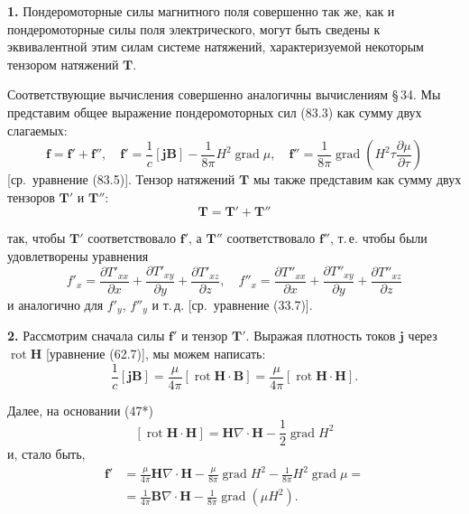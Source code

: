 \documentclass[a4paper,12pt]{article}
\begin{document}

\textbf{1.} Пондеромоторные силы магнитного поля совершенно так же,
как и пондеромоторные силы поля электрического, могут быть сведены
к эквивалентной этим силам системе натяжений, характеризуемой некоторым
тензором натяжений $\mathbf{T}$.

Соответствующие вычисления совершенно аналогичны вычислениям §\,34.
Мы представим общее выражение пондеромоторных сил (83.3) как сумму
двух слагаемых:
\begin{equation}
    \mathbf{f} = \mathbf{f}' + \mathbf{f}'', \quad
    \mathbf{f}' = \frac{1}{c}[\mathbf{j}\mathbf{B}]
               - \frac{1}{8\pi}H^2\operatorname{grad}\mu, \quad
    \mathbf{f}'' = \frac{1}{8\pi}\operatorname{grad}\!\left(
        H^2\tau\frac{\partial\mu}{\partial\tau}
    \right)
    \tag{84.1}
\end{equation}
[ср.\ уравнение (83.5)]. Тензор натяжений $\mathbf{T}$ мы также
представим как сумму двух тензоров $\mathbf{T}'$ и $\mathbf{T}''$:
\begin{equation}
    \mathbf{T} = \mathbf{T}' + \mathbf{T}''
    \tag{84.2}
\end{equation}


так, чтобы $\mathbf{T}'$ соответствовало $\mathbf{f}'$, а $\mathbf{T}''$
соответствовало $\mathbf{f}''$, т.\,е. чтобы были удовлетворены уравнения
\begin{equation}
    f'_x = \frac{\partial T'_{xx}}{\partial x}
          + \frac{\partial T'_{xy}}{\partial y}
          + \frac{\partial T'_{xz}}{\partial z}, \quad
    f''_x = \frac{\partial T''_{xx}}{\partial x}
           + \frac{\partial T''_{xy}}{\partial y}
           + \frac{\partial T''_{xz}}{\partial z}
    \tag{84.3}
\end{equation}
и аналогично для $f'_y$, $f''_y$ и т.\,д. [ср.\ уравнение (33.7)].

\textbf{2.} Рассмотрим сначала силы $\mathbf{f}'$ и тензор $\mathbf{T}'$.
Выражая плотность токов $\mathbf{j}$ через $\operatorname{rot}\mathbf{H}$
[уравнение (62.7)], мы можем написать:
$$
    \frac{1}{c}[\mathbf{j}\mathbf{B}]
    = \frac{\mu}{4\pi}[\operatorname{rot}\mathbf{H}\cdot\mathbf{B}]
    = \frac{\mu}{4\pi}[\operatorname{rot}\mathbf{H}\cdot\mathbf{H}].
$$

Далее, на основании (47*)
$$
    [\operatorname{rot}\mathbf{H}\cdot\mathbf{H}]
    = \mathbf{H}\nabla\cdot\mathbf{H} - \frac{1}{2}\operatorname{grad}H^2
$$
и, стало быть,
\begin{align*}
    \mathbf{f}' &= \frac{\mu}{4\pi}\mathbf{H}\nabla\cdot\mathbf{H}
                 - \frac{\mu}{8\pi}\operatorname{grad}H^2
                 - \frac{1}{8\pi}H^2\operatorname{grad}\mu = \\
                &= \frac{1}{4\pi}\mathbf{B}\nabla\cdot\mathbf{H}
                 - \frac{1}{8\pi}\operatorname{grad}(\mu H^2).
\end{align*}
\end{document}
